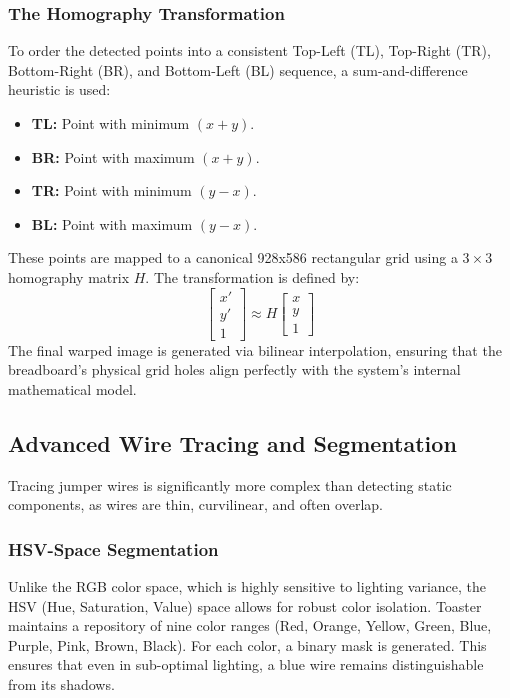 \documentclass[11pt,a4paper]{article}
\begin{document}
\subsubsection{The Homography Transformation}
To order the detected points into a consistent Top-Left (TL), Top-Right (TR), Bottom-Right (BR), and Bottom-Left (BL) sequence, a sum-and-difference heuristic is used:
\begin{itemize}
    \item \textbf{TL:} Point with minimum $(x+y)$.
    \item \textbf{BR:} Point with maximum $(x+y)$.
    \item \textbf{TR:} Point with minimum $(y-x)$.
    \item \textbf{BL:} Point with maximum $(y-x)$.
\end{itemize}
These points are mapped to a canonical 928x586 rectangular grid using a $3 \times 3$ homography matrix $H$. The transformation is defined by:
\begin{equation}
    \begin{bmatrix} x' \\ y' \\ 1 \end{bmatrix} \approx H \begin{bmatrix} x \\ y \\ 1 \end{bmatrix}
\end{equation}
The final warped image is generated via bilinear interpolation, ensuring that the breadboard's physical grid holes align perfectly with the system's internal mathematical model.

\subsection{Advanced Wire Tracing and Segmentation}
Tracing jumper wires is significantly more complex than detecting static components, as wires are thin, curvilinear, and often overlap.

\subsubsection{HSV-Space Segmentation}
Unlike the RGB color space, which is highly sensitive to lighting variance, the HSV (Hue, Saturation, Value) space allows for robust color isolation. Toaster maintains a repository of nine color ranges (Red, Orange, Yellow, Green, Blue, Purple, Pink, Brown, Black). For each color, a binary mask is generated. This ensures that even in sub-optimal lighting, a blue wire remains distinguishable from its shadows.
\end{document}
